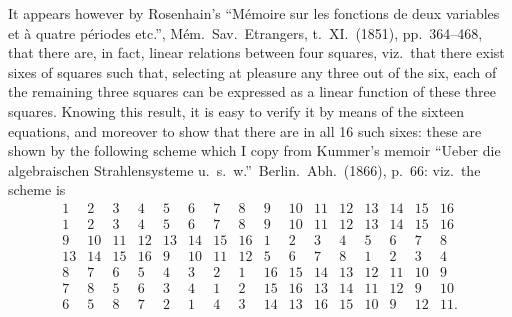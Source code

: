 \documentclass[11pt,a4paper]{article}
\begin{document}
It appears however by Rosenhain's ``M\'emoire sur les fonctions de deux variables et \`a quatre p\'eriodes etc.'', M\'em.\ Sav.\ Etrangers, t.~XI.\ (1851), pp.~364--468, that there are, in fact, linear relations between four squares, viz.\ that there exist sixes of squares such that, selecting at pleasure any three out of the six, each of the remaining three squares can be expressed as a linear function of these three squares. Knowing this result, it is easy to verify it by means of the sixteen equations, and moreover to show that there are in all 16 such sixes: these are shown by the following scheme which I copy from Kummer's memoir ``Ueber die algebraischen Strahlensysteme u.~s.~w.''\ Berlin.\ Abh.\ (1866), p.~66: viz.\ the scheme is
\[
\begin{array}{cccccccccccccccc}
1 & 2 & 3 & 4 & 5 & 6 & 7 & 8 & 9 & 10 & 11 & 12 & 13 & 14 & 15 & 16\\
\hline
1 & 2 & 3 & 4 & 5 & 6 & 7 & 8 & 9 & 10 & 11 & 12 & 13 & 14 & 15 & 16\\
9 & 10 & 11 & 12 & 13 & 14 & 15 & 16 & 1 & 2 & 3 & 4 & 5 & 6 & 7 & 8\\
13 & 14 & 15 & 16 & 9 & 10 & 11 & 12 & 5 & 6 & 7 & 8 & 1 & 2 & 3 & 4\\
8 & 7 & 6 & 5 & 4 & 3 & 2 & 1 & 16 & 15 & 14 & 13 & 12 & 11 & 10 & 9\\
7 & 8 & 5 & 6 & 3 & 4 & 1 & 2 & 15 & 16 & 13 & 14 & 11 & 12 & 9 & 10\\
6 & 5 & 8 & 7 & 2 & 1 & 4 & 3 & 14 & 13 & 16 & 15 & 10 & 9 & 12 & 11.
\end{array}
\]

\newpage

\end{document}
